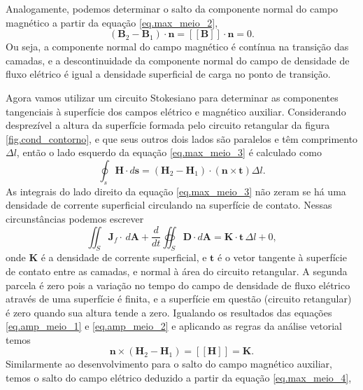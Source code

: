 Analogamente, podemos determinar o salto da componente normal do campo magn\'etico a partir da equa\c{c}\~ao \ref{eq.max_meio_2},
\begin{equation*}
(\mathbf{B}_2-\mathbf{B}_1)\cdot\mathbf{n}=\left[\left[\mathbf{B}\right]\right]\cdot\mathbf{n}=0.
\end{equation*}  
Ou seja, a componente normal do campo magn\'etico \'e cont\'inua na transi\c{c}\~ao das camadas, e a descontinuidade da componente normal do campo de densidade de fluxo el\'etrico \'e igual a densidade superficial de carga no ponto de transi\c{c}\~ao.

Agora vamos utilizar um circuito Stokesiano para determinar as componentes tangenciais \`a superf\'icie dos campos el\'etrico e magn\'etico auxiliar. Considerando desprez\'ivel a altura da superf\'icie formada pelo circuito retangular da figura \ref{fig.cond_contorno}, e que seus outros dois lados s\~ao paralelos e t\^em comprimento $\Delta l$, ent\~ao o lado esquerdo da equa\c{c}\~ao \ref{eq.max_meio_3} \'e calculado como
\begin{equation}\label{eq.amp_meio_1}
\oint_s\mathbf{H}\cdot d\mathbf{s}=(\mathbf{H}_2-\mathbf{H}_1)\cdot(\mathbf{n}\times\mathbf{t})\Delta l.
\end{equation}
As integrais do lado direito da equa\c{c}\~ao \ref{eq.max_meio_3} n\~ao zeram se h\'a uma densidade de corrente superficial circulando na superf\'icie de contato. Nessas circunst\^ancias podemos escrever
\begin{equation}\label{eq.amp_meio_2}
\iint_S\mathbf{J}_f\cdot\,d\mathbf{A}+\frac{d}{dt}\oiint_S\mathbf{D}\cdot\textit{d}\textbf{A}=\mathbf{K}\cdot\mathbf{t}\,\Delta l+0,
\end{equation}
onde $\mathbf{K}$ \'e a densidade de corrente superficial, e $\mathbf{t}$ \'e o vetor tangente \`a superf\'icie de contato entre as camadas, e normal \`a \'area do circuito retangular. A segunda parcela \'e zero pois a varia\c{c}\~ao no tempo do campo de densidade de fluxo el\'etrico atrav\'es de uma superf\'icie \'e finita, e a superf\'icie em quest\~ao (circuito retangular) \'e zero quando sua altura tende a zero. Igualando os resultados das equa\c{c}\~oes \ref{eq.amp_meio_1} e \ref{eq.amp_meio_2} e aplicando as regras da an\'alise vetorial temos
\begin{equation}\label{eq.far_meio_1}
\mathbf{n}\times(\mathbf{H}_2-\mathbf{H}_1)=\left[\left[\mathbf{H}\right]\right]=\mathbf{K}.
\end{equation}
Similarmente ao desenvolvimento para o salto do campo magn\'etico auxiliar, temos o salto do campo el\'etrico deduzido a partir da equa\c{c}\~ao \ref{eq.max_meio_4},

